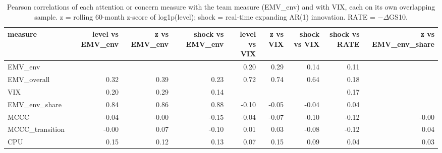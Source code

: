 \begin{table}
\caption{Pearson correlations of each attention or concern measure with the team measure (EMV\_env) and with VIX, each on its own overlapping sample. z = rolling 60-month z-score of log1p(level); shock = real-time expanding AR(1) innovation. RATE = $-\Delta$GS10.}
\label{tab:m1_measure_corr}
\begin{tabular}{lrrrrrrrr}
\toprule
measure & level vs EMV\_env & z vs EMV\_env & shock vs EMV\_env & level vs VIX & z vs VIX & shock vs VIX & shock vs RATE & z vs EMV\_env\_share \\
\midrule
EMV\_env &  &  &  & 0.20 & 0.29 & 0.14 & 0.11 &  \\
EMV\_overall & 0.32 & 0.39 & 0.23 & 0.72 & 0.74 & 0.64 & 0.18 &  \\
VIX & 0.20 & 0.29 & 0.14 &  &  &  & 0.17 &  \\
EMV\_env\_share & 0.84 & 0.86 & 0.88 & -0.10 & -0.05 & -0.04 & 0.04 &  \\
MCCC & -0.04 & -0.00 & -0.15 & -0.04 & -0.07 & -0.10 & -0.12 & -0.00 \\
MCCC\_transition & -0.00 & 0.07 & -0.10 & 0.01 & 0.03 & -0.08 & -0.12 & 0.04 \\
CPU & 0.15 & 0.12 & 0.13 & 0.07 & 0.15 & 0.09 & 0.04 & 0.03 \\
\bottomrule
\end{tabular}
\end{table}
